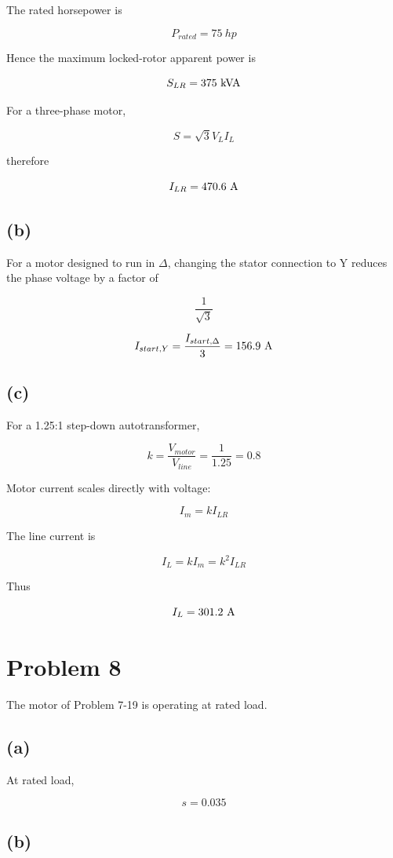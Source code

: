 \documentclass[12pt]{article}
\begin{document}
The rated horsepower is

\[
P_{rated}=75\ hp
\]

Hence the maximum locked-rotor apparent power is

\[
S_{LR}=375\ {\rm kVA}
\]

For a three-phase motor,

\[
S=\sqrt{3}V_L I_L
\]

therefore

\[
I_{LR}
=
470.6\ {\rm A}
\]


\subsection*{(b)}

For a motor designed to run in $\Delta$, changing the stator connection to Y
reduces the phase voltage by a factor of

\[
\frac{1}{\sqrt3}
\]

\[
I_{start,Y}
=
\frac{I_{start,\Delta}}{3}
=
156.9\ {\rm A}
\]

\subsection*{(c)}

For a 1.25:1 step-down autotransformer,

\[
k=\frac{V_{motor}}{V_{line}}
=
\frac{1}{1.25}
=
0.8
\]

Motor current scales directly with voltage:

\[
I_m=kI_{LR}
\]

The line current is

\[
I_L=kI_m=k^2I_{LR}
\]

Thus

\[
I_L=301.2\ {\rm A}
\]

\newpage

\section*{Problem 8}

The motor of Problem 7-19 is operating at rated load.

\subsection*{(a) }

At rated load,

\[
s=0.035
\]

\subsection*{(b) }
\end{document}
